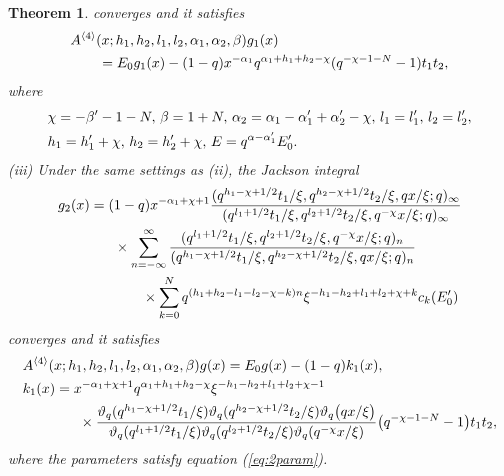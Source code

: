 \documentclass[12pt]{amsart}
\numberwithin{equation}{section}
\newtheorem{thm}{Theorem}[section]
\theoremstyle{definition}
\theoremstyle{remark}
\begin{document}
\begin{thm}
converges and it satisfies
  \begin{align}
    &A^{\langle 4 \rangle} (x; h_{1}, h_{2}, l_{1}, l_{2}, \alpha_{1}, \alpha_{2}, \beta) g_1 (x) \label{eq:2A4g1} \\
    &\qquad = E_0 g _1 (x) - (1 - q) x^{- \alpha_{1}}q^{\alpha_{1} + h_{1} + h_{2} - \chi}(q^{-\chi - 1 - N} - 1)t_{1}t_{2} , \notag
  \end{align}
where 
\begin{align}
&\chi = -\beta' - 1 - N, \, \beta = 1 + N, \, \alpha_{2} = \alpha_{1} - \alpha_{1}' + \alpha_{2}' - \chi, \, l_{1} = l_{1}', \, l_{2} = l_{2}', \label{eq:2param} \\ 
& h_{1} = h_{1}' + \chi, \, h_{2} = h_{2}' + \chi, \, E = q^{\alpha - \alpha_{1}'}E_{0}' . \notag
\end{align}
(iii) Under the same settings as (ii), the Jackson integral
  \begin{align}
 & g _2 (x) = (1 - q)x^{-\alpha_{1} + \chi + 1} \frac{(q^{h_{1} - \chi + 1/2}t_{1}/\xi, q^{h_{2} - \chi + 1/2}t_{2}/\xi, qx/\xi; q)_{\infty}}{(q^{l_{1} + 1/2}t_{1}/\xi, q^{l_{2} + 1/2}t_{2}/\xi, q^{-\chi}x/\xi; q)_{\infty}}  \label{eq:2g2} \\
& \qquad \qquad \times \sum_{n = -\infty}^{\infty} \frac{(q^{l_{1} + 1/2}t_{1}/\xi, q^{l_{2} + 1/2}t_{2}/\xi, q^{-\chi}x/\xi; q)_{n}}{(q^{h_{1} - \chi + 1/2}t_{1}/\xi, q^{h_{2} - \chi + 1/2}t_{2}/\xi, qx/\xi; q)_{n}} \notag \\
& \qquad \qquad \qquad \times \sum_{k = 0}^{N} q^{(h_{1} + h_{2} - l_{1} - l_{2} - \chi -k )n} \xi ^{ -h_{1} - h_{2} + l_{1} + l_{2} + \chi +k } c_{k}(E'_0) \notag
  \end{align}
converges and it satisfies
  \begin{align}
    & A^{\langle 4 \rangle} (x; h_{1}, h_{2}, l_{1}, l_{2}, \alpha_{1}, \alpha_{2}, \beta) g(x) = E_0 g(x) - (1 - q)k_{1}(x), \label{eq:2A4g2} \\
    & k_{1}(x) = x^{- \alpha _1+ \chi +1} q^{\alpha_{1} + h_{1} + h_{2} - \chi } \xi^{-h_{1} - h_{2} + l_{1} + l_{2} + \chi -1} \notag \\
    & \qquad \qquad \times \frac{\vartheta _q (q^{h_{1} - \chi + 1/2}t_{1}/\xi) \vartheta _q (q^{h_{2} - \chi + 1/2}t_{2}/\xi) \vartheta_{q} \big(qx/\xi \big)}{\vartheta _q (q^{l_{1} + 1/2}t_{1}/\xi) \vartheta _q (q^{l_{2} + 1/2}t_{2}/\xi) \vartheta_{q} (q^{-\chi } x/\xi )} \big( q^{ -\chi - 1 -N} - 1 \big) t_{1} t_{2} , \notag
  \end{align}
where the parameters satisfy equation (\ref{eq:2param}).
\end{thm}
\end{document}
